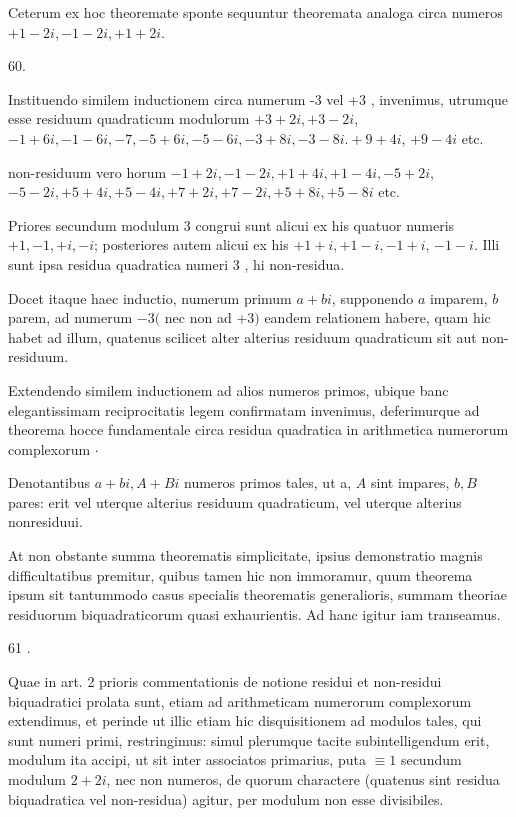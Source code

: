 \documentclass[10pt]{article}
\begin{document}
Ceterum ex hoc theoremate sponte sequuntur theoremata analoga circa numeros \(+1-2 i,-1-2 i,+1+2 i\).

60.

Instituendo similem inductionem circa numerum -3 vel +3 , invenimus, utrumque esse residuum quadraticum modulorum \(+3+2 i,+3-2 i\),
\(-1+6 i,-1-6 i,-7,-5+6 i,-5-6 i,-3+8 i,-3-8 i .+9+4 i\), \(+9-4 i\) etc.

non-residuum vero horum \(-1+2 i,-1-2 i,+1+4 i,+1-4 i,-5+2 i\), \(-5-2 i,+5+4 i,+5-4 i,+7+2 i,+7-2 i,+5+8 i,+5-8 i\) etc.

Priores secundum modulum 3 congrui sunt alicui ex his quatuor numeris \(+1,-1,+i,-i\); posteriores autem alicui ex his \(+1+i,+1-i,-1+i\), \(-1-i\). Illi sunt ipsa residua quadratica numeri 3 , hi non-residua.

Docet itaque haec inductio, numerum primum \(a+b i\), supponendo \(a\) imparem, \(b\) parem, ad numerum \(-3(\) nec non ad +3\()\) eandem relationem habere, quam hic habet ad illum, quatenus scilicet alter alterius residuum quadraticum sit aut non-residuum.

Extendendo similem inductionem ad alios numeros primos, ubique banc elegantissimam reciprocitatis legem confirmatam invenimus, deferimurque ad theorema hocce fundamentale circa residua quadratica in arithmetica numerorum complexorum \(\cdot\)

Denotantibus \(a+b i, A+B i\) numeros primos tales, ut a, \(A\) sint impares, \(b, B\) pares: erit vel uterque alterius residuum quadraticum, vel uterque alterius nonresiduui.

At non obstante summa theorematis simplicitate, ipsius demonstratio magnis difficultatibus premitur, quibus tamen hic non immoramur, quum theorema ipsum sit tantummodo casus specialis theorematis generalioris, summam theoriae residuorum biquadraticorum quasi exhaurientis. Ad hanc igitur iam transeamus.

61 .

Quae in art. 2 prioris commentationis de notione residui et non-residui biquadratici prolata sunt, etiam ad arithmeticam numerorum complexorum extendimus, et perinde ut illic etiam hic disquisitionem ad modulos tales, qui sunt numeri primi, restringimus: simul plerumque tacite subintelligendum erit, modulum ita accipi, ut sit inter associatos primarius, puta \(\equiv 1\) secundum modulum \(2+2 i\), nec non numeros, de quorum charactere (quatenus sint residua biquadratica vel non-residua) agitur, per modulum non esse divisibiles.
\end{document}
